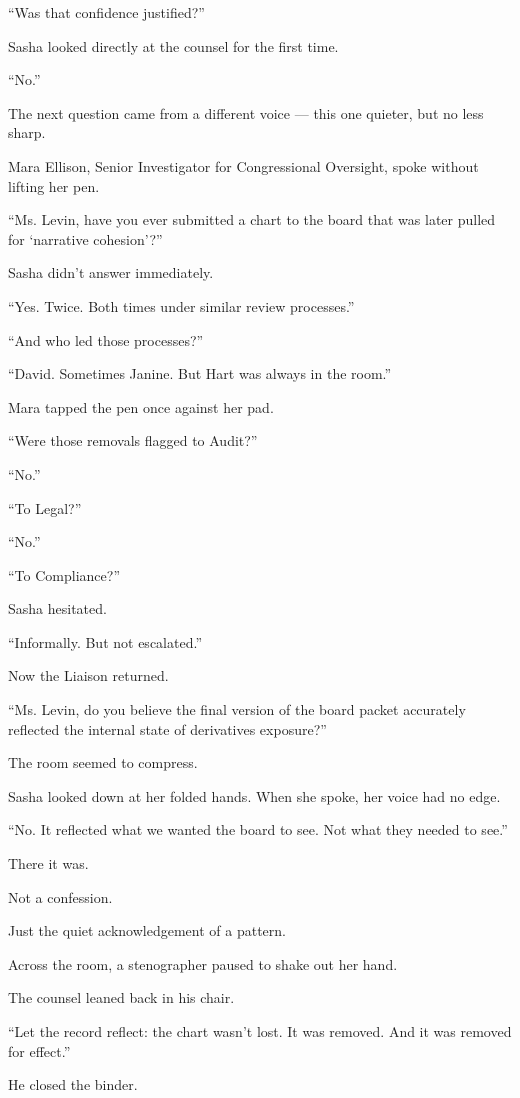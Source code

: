 “Was that confidence justified?”

Sasha looked directly at the counsel for the first time.

“No.”

The next question came from a different voice — this one quieter, but no less sharp.

Mara Ellison, Senior Investigator for Congressional Oversight, spoke without lifting her pen.

“Ms. Levin, have you ever submitted a chart to the board that was later pulled for ‘narrative cohesion’?”

Sasha didn’t answer immediately.

“Yes. Twice. Both times under similar review processes.”

“And who led those processes?”

“David. Sometimes Janine. But Hart was always in the room.”

Mara tapped the pen once against her pad.

“Were those removals flagged to Audit?”

“No.”

“To Legal?”

“No.”

“To Compliance?”

Sasha hesitated.

“Informally. But not escalated.”

Now the Liaison returned.

“Ms. Levin, do you believe the final version of the board packet accurately reflected the internal state of 
derivatives exposure?”

The room seemed to compress.

Sasha looked down at her folded hands. When she spoke, her voice had no edge.

“No. It reflected what we wanted the board to see. Not what they needed to see.”

There it was.

Not a confession.

Just the quiet acknowledgement of a pattern.

Across the room, a stenographer paused to shake out her hand.

The counsel leaned back in his chair.

“Let the record reflect:
the chart wasn’t lost.
It was removed.
And it was removed for effect.”

He closed the binder.

